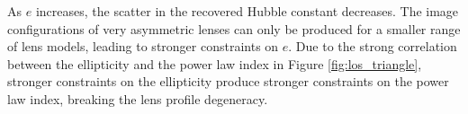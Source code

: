 As $e$ increases, the scatter in the recovered Hubble constant decreases. The image configurations of very asymmetric lenses can only be produced for a smaller range of lens models, leading to stronger constraints on $e$. Due to the strong correlation between the ellipticity and the power law index in Figure \ref{fig:los_triangle}, stronger constraints on the ellipticity produce stronger constraints on the power law index, breaking the lens profile degeneracy. 